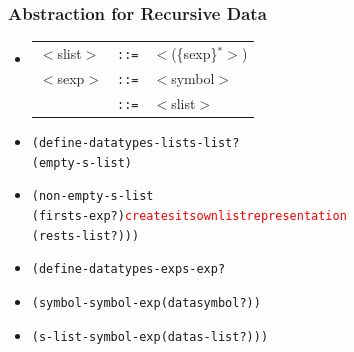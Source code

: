 \documentclass{beamer}
\newcommand{\is}{\texttt{::=}}
\begin{document}
\begin{frame}[fragile]
\frametitle{Abstraction for Recursive Data}
\begin{scriptsize}
\begin{itemize}
\item<1->
\begin{tabular}{lll}
   $<$slist$>$ & \is{} & $<$(\{sexp\}$^*>$) \\
   $<$sexp$>$  & \is{} & $<$symbol$>$ \\
               & \is{} & $<$slist$>$ \\
\end{tabular}

\item<2->
\begin{alltt}
(define-datatype s-list s-list?
  (empty-s-list)
\end{alltt}

\item<3->
\begin{alltt}
  (non-empty-s-list
    (first s-exp?)   \textcolor{red}{creates its own list representation}
    (rest s-list?)))
\end{alltt}

\item<4->
\begin{alltt}
(define-datatype s-exp s-exp?
\end{alltt}

\item<5->
\begin{alltt}
  (symbol-symbol-exp (data symbol?))
\end{alltt}

\item<6->
\begin{alltt}
  (s-list-symbol-exp (data s-list?)) )
\end{alltt}

\end{itemize}
\end{scriptsize}
\end{frame}
\end{document}
